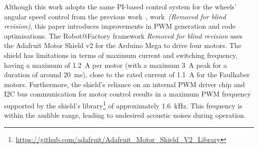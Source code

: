 \documentclass[letterpaper,10pt,conference]{IEEEtran} %
\def\finalversion{}
\begin{document}

Although this work adopts the same PI-based control system
for the wheels' angular speed control from the previous
\ifdefined\finalversion
work~\cite{sousa2024icarsc},
\else
work~\textit{(Removed for blind revision)},
\fi
this paper introduces improvements in PWM generation and code optimisations.
The
\ifdefined\finalversion
Robot@Factory framework
\else
\textit{Removed for blind revision}
\fi
uses the Adafruit Motor Shield v2
for the Arduino Mega to drive four motors.
The shield has limitations in terms of maximum current and switching frequency,
having a maximum of 1.2~A per motor
(with a maximum 3~A peak for a duration of around 20~ms),
close to the rated current of 1.1~A for the Faulhaber motors.
Furthermore, the shield's reliance on an internal PWM driver chip
and I2C bus communication for motor control results in a
maximum PWM frequency supported by the 
shield's library\footnote{\url{https://github.com/adafruit/Adafruit_Motor_Shield_V2_Library}}
of approximately 1.6~kHz. This frequency is within the audible range,
leading to undesired acoustic noises during operation.
\end{document}
